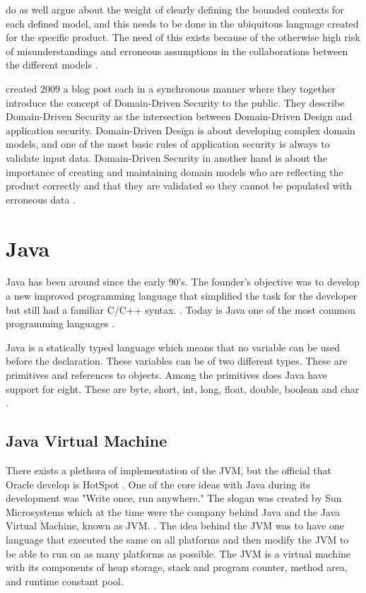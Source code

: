 \textcite{evans_2015} do as well argue about the weight of clearly defining the bounded contexts for each defined model, and this needs to be done in the ubiquitous language created for the specific product. The need of this exists because of the otherwise high risk of misunderstandings and erroneous assumptions in the collaborations between the different models \parencite{millett_2015}.

\textcite{Wilander2009, Johnsson2009} created 2009 a blog post each in a synchronous manner where they together introduce the concept of Domain-Driven Security to the public. They describe Domain-Driven Security as the intersection between Domain-Driven Design and application security. Domain-Driven Design is about developing complex domain models, and one of the most basic rules of application security is always to validate input data. Domain-Driven Security in another hand is about the importance of creating and maintaining domain models who are reflecting the product correctly and that they are validated so they cannot be populated with erroneous data \parencite{Wilander2009, Johnsson2009, Arnor2016, Stendahl2016}.



\section{Java}
\label{JavaInstrumentation}
Java has been around since the early 90's. The founder's objective was to develop a new improved programming language that simplified the task for the developer but still had a familiar C/C++ syntax. \parencite{OracleVoice}. Today is Java one of the most common programming languages \parencite{octoverse}.

Java is a statically typed language which means that no variable can be used before the declaration. These variables can be of two different types. These are primitives and references to objects. Among the primitives does Java have support for eight. These are byte, short, int, long, float, double, boolean and char \parencite{primjav}.



\subsection{Java Virtual Machine}
There exists a plethora of implementation of the JVM, but the official that Oracle develop is HotSpot \parencite{hotSpot}. One of the core ideas with Java during its development was "Write once, run anywhere." The slogan was created by Sun Microsystems which at the time were the company behind Java and the Java Virtual Machine, known as JVM. \parencite{Craig_2006}. The idea behind the JVM was to have one language that executed the same on all platforms and then modify the JVM to be able to run on as many platforms as possible. The JVM is a virtual machine with its components of heap storage, stack and program counter, method area, and runtime constant pool.

